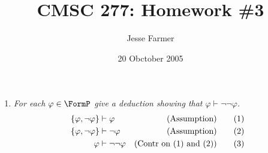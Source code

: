 \documentclass[10pt]{article}
\title{CMSC 277: Homework \#3}
\author{Jesse Farmer}
\date{20 Obctober 2005}
\begin{document}
\maketitle

\begin{enumerate}
\item \emph{For each $\varphi \in \FormP$ give a deduction showing that $\varphi \vdash \neg\neg\varphi$.}
\begin{align*}
\left\{ \varphi, \neg\varphi \right\} &\vdash \varphi & (\mbox{Assumption}) \tag{1}\\
\left\{ \varphi, \neg\varphi \right\} &\vdash \neg\varphi & (\mbox{Assumption}) \tag{2} \\
\varphi & \vdash \neg\neg\varphi & (\mbox{Contr on (1) and (2)}) \tag{3}
\end{align*}


\end{enumerate}
\end{document}
